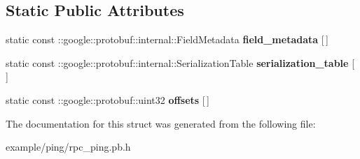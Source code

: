 \subsection*{Static Public Attributes}
\begin{DoxyCompactItemize}
\item 
\mbox{\label{structTableStruct__rpc__5fping__2eproto_a400ac22bd2312f75e93d5aaa830079e7}} 
static const \+::google\+::protobuf\+::internal\+::\+Field\+Metadata {\bfseries field\+\_\+metadata} \mbox{[}$\,$\mbox{]}
\item 
\mbox{\label{structTableStruct__rpc__5fping__2eproto_a5b90493a6b5a0c4c34cf3b03b49a7132}} 
static const \+::google\+::protobuf\+::internal\+::\+Serialization\+Table {\bfseries serialization\+\_\+table} \mbox{[}$\,$\mbox{]}
\item 
\mbox{\label{structTableStruct__rpc__5fping__2eproto_a7693f8d0a951185c38bcd9490183f46d}} 
static const \+::google\+::protobuf\+::uint32 {\bfseries offsets} \mbox{[}$\,$\mbox{]}
\end{DoxyCompactItemize}


The documentation for this struct was generated from the following file\+:\begin{DoxyCompactItemize}
\item 
example/ping/rpc\+\_\+ping.\+pb.\+h\end{DoxyCompactItemize}
